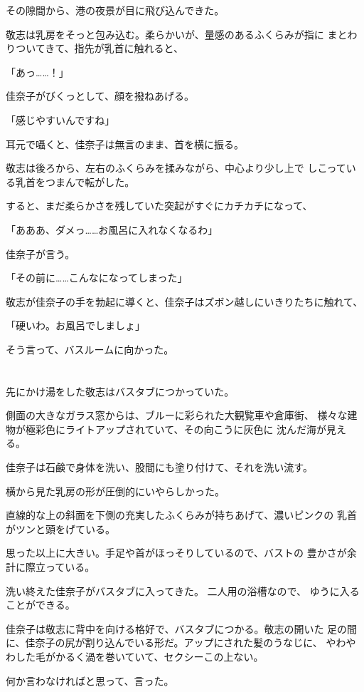 ﻿\documentclass[
    book,tate,
    line_length=30zw,
    jafontsize=12pt,
    paper=b5j,
    landscape,
    ]{jlreq}
\begin{document}
その隙間から、港の夜景が目に飛び込んできた。

敬志は乳房をそっと包み込む。柔らかいが、量感のあるふくらみが指に
まとわりついてきて、指先が乳首に触れると、

「あっ……！」

佳奈子がびくっとして、顔を撥ねあげる。

「感じやすいんですね」

耳元で囁くと、佳奈子は無言のまま、首を横に振る。

敬志は後ろから、左右のふくらみを揉みながら、中心より少し上で
しこっている乳首をつまんで転がした。

すると、まだ柔らかさを残していた突起がすぐにカチカチになって、

「あああ、ダメっ……お風呂に入れなくなるわ」

佳奈子が言う。

「その前に……こんなになってしまった」

敬志が佳奈子の手を勃起に導くと、佳奈子はズボン越しにいきりたちに触れて、

「硬いわ。お風呂でしましょ」

そう言って、バスルームに向かった。

\section*{}

先にかけ湯をした敬志はバスタブにつかっていた。

側面の大きなガラス窓からは、ブルーに彩られた大観覧車や倉庫街、
様々な建物が極彩色にライトアップされていて、その向こうに灰色に
沈んだ海が見える。

佳奈子は石鹸で身体を洗い、股間にも塗り付けて、それを洗い流す。

横から見た乳房の形が圧倒的にいやらしかった。

直線的な上の斜面を下側の充実したふくらみが持ちあげて、濃いピンクの
乳首がツンと頭をげている。

思った以上に大きい。手足や首がほっそりしているので、バストの
豊かさが余計に際立っている。

洗い終えた佳奈子がバスタブに入ってきた。 二人用の浴槽なので、
ゆうに入ることができる。

佳奈子は敬志に背中を向ける格好で、バスタブにつかる。敬志の開いた
足の間に、佳奈子の尻が割り込んでいる形だ。アップにされた髪のうなじに、
やわやわした毛がかるく渦を巻いていて、セクシーこの上ない。

何か言わなければと思って、言った。
\end{document}
